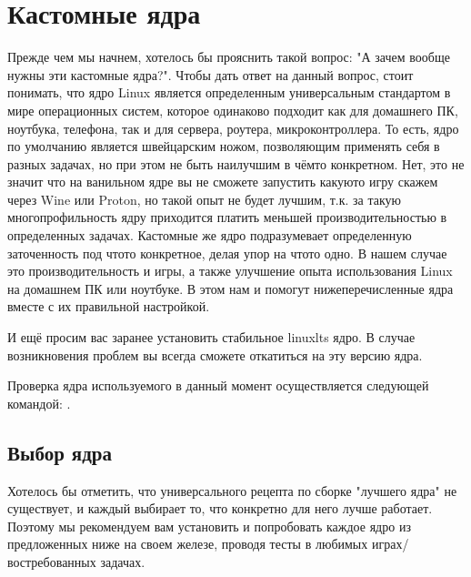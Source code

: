 \documentclass[letterpaper,10pt,russian,openany]{sphinxmanual}
\begin{document}
\chapter{Кастомные ядра}
\label{\detokenize{source/custom-kernels:custom-kernels}}\label{\detokenize{source/custom-kernels:id1}}\label{\detokenize{source/custom-kernels::doc}}
\sphinxAtStartPar
Прежде чем мы начнем, хотелось бы прояснить такой вопрос: "А зачем вообще нужны эти кастомные ядра?".
Чтобы дать ответ на данный вопрос, стоит понимать, что ядро Linux является определенным универсальным стандартом в мире
операционных систем, которое одинаково подходит как для домашнего ПК, ноутбука, телефона, так и для сервера, роутера, микро\sphinxhyphen{}контроллера.
То есть, ядро по умолчанию является швейцарским ножом, позволяющим применять себя в разных задачах,
но при этом не быть наилучшим в чём\sphinxhyphen{}то конкретном. Нет, это не значит что на ванильном ядре вы не сможете запустить какую\sphinxhyphen{}то игру скажем через Wine или Proton,
но такой опыт не будет лучшим, т.к. за такую многопрофильность ядру приходится платить меньшей производительностью в определенных задачах.
Кастомные же ядро подразумевает определенную заточенность под что\sphinxhyphen{}то конкретное,
делая упор на что\sphinxhyphen{}то одно. В нашем случае это производительность и игры, а также улучшение опыта использования Linux на домашнем
ПК или ноутбуке. В этом нам и помогут нижеперечисленные ядра вместе с их правильной настройкой.

\sphinxAtStartPar
И ещё просим вас заранее установить стабильное linux\sphinxhyphen{}lts ядро.
В случае возникновения проблем вы всегда сможете откатиться на эту версию ядра.

\sphinxAtStartPar
Проверка ядра используемого в данный момент осуществляется следующей командой: .

\ignorespaces 

\section{Выбор ядра}
\label{\detokenize{source/custom-kernels:kernel-choose}}\label{\detokenize{source/custom-kernels:index-0}}\label{\detokenize{source/custom-kernels:id2}}
\sphinxAtStartPar
Хотелось бы отметить, что универсального рецепта по сборке "лучшего ядра" не существует,
и каждый выбирает то, что конкретно для него лучше работает. Поэтому мы рекомендуем вам
установить и попробовать каждое ядро из предложенных ниже на своем железе, проводя тесты
в любимых играх/востребованных задачах.
\end{document}
